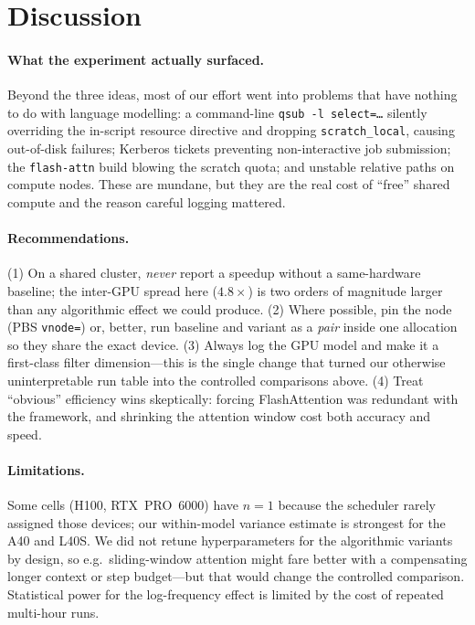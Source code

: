 \documentclass[11pt]{article}
\begin{document}
\section{Discussion}
\label{sec:discussion}

\paragraph{What the experiment actually surfaced.} Beyond the three
ideas, most of our effort went into problems that have nothing to do with
language modelling: a command-line \texttt{qsub -l select=\dots} silently
overriding the in-script resource directive and dropping \texttt{scratch\_local},
causing out-of-disk failures; Kerberos tickets preventing non-interactive job
submission; the \texttt{flash-attn} build blowing the scratch quota; and unstable
relative paths on compute nodes. These are mundane, but they are the real cost of
``free'' shared compute and the reason careful logging mattered.

\paragraph{Recommendations.} (1) On a shared cluster, \emph{never} report a
speedup without a same-hardware baseline; the inter-GPU spread here ($4.8\times$)
is two orders of magnitude larger than any algorithmic effect we could produce.
(2) Where possible, pin the node (PBS \texttt{vnode=}) or, better, run baseline
and variant as a \emph{pair} inside one allocation so they share the exact device.
(3) Always log the GPU model and make it a first-class filter dimension---this is
the single change that turned our otherwise uninterpretable run table into the
controlled comparisons above. (4) Treat ``obvious'' efficiency wins skeptically:
forcing FlashAttention was redundant with the framework, and shrinking the
attention window cost both accuracy and speed.

\paragraph{Limitations.} Some cells (H100, RTX~PRO~6000) have $n{=}1$ because the
scheduler rarely assigned those devices; our within-model variance estimate is
strongest for the A40 and L40S. We did not retune hyperparameters for the
algorithmic variants by design, so e.g.\ sliding-window attention might fare
better with a compensating longer context or step budget---but that would change
the controlled comparison. Statistical power for the log-frequency effect is
limited by the cost of repeated multi-hour runs.
\end{document}
